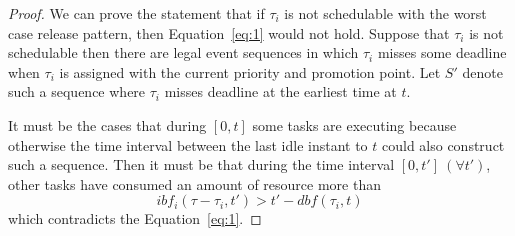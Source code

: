 \documentclass[12pt,conference,twocolumn]{IEEEtran}
\newtheorem{proof}{Proof}
\newtheorem{example}{Example}
\newcommand{\my}[1]{{\color{blue}{#1}}}
\begin{document}
\begin{proof}
We can prove the statement that if $\tau_i$ is not schedulable with the worst case release pattern, then Equation~\ref{eq:1} would not hold. Suppose that $\tau_i$ is not schedulable then there are legal event sequences in which $\tau_i$ misses some deadline when $\tau_i$ is assigned with the current priority and promotion point. Let $S'$ denote such a sequence where $\tau_i$ misses deadline at the earliest time at $t$.

It must be the cases that during $[0,t]$ some tasks are executing because otherwise the time interval between the last idle instant to $t$ could also construct such a sequence. Then it must be that during the time interval $[0,t']~(\forall t')$, other tasks have consumed an amount of resource more than 
\[
ibf_i(\tau-\tau_i,t')>t'-dbf(\tau_i,t)
\]
which contradicts the Equation~\ref{eq:1}.
\end{proof}










\end{document}
